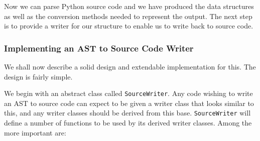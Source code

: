 \documentclass{report}
\begin{document}
Now we can parse Python source code and we have produced the data structures as well as the conversion methods needed to represent the output. The next
step is to provide a writer for our structure to enable us to write back to source code.

\subsubsection{Implementing an AST to Source Code Writer}

We shall now describe a solid design and extendable implementation for this. The design is fairly simple.

We begin with an abstract class called \texttt{SourceWriter}. Any code wishing to write an AST to source code can expect to be given a writer
class that looks similar to this, and any writer classes should be derived from this base. \texttt{SourceWriter} will define a number of functions
to be used by its derived writer classes. Among the more important are:
\end{document}
